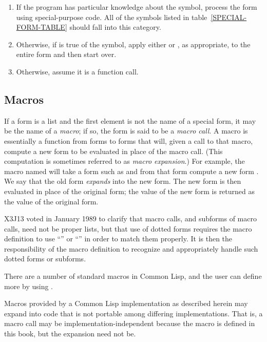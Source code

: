 \begin{enumerate}
\item
If the program has particular knowledge about the symbol,
process the form using special-purpose code.
All of the symbols listed in table~\ref{SPECIAL-FORM-TABLE}
should fall into this category. 

\item
Otherwise, if  is true of the symbol, apply either
 or , as appropriate,
to the entire form and then start over.

\item
Otherwise, assume it is a function call.
\end{enumerate}

\subsection{Macros}

If a form is a list and the first element is not the name of a special
form, it may be the name of a \emph{macro}; if so, the form is said
to be a \emph{macro call}.  A macro is essentially a function from
forms to forms that will, given a call to that macro, compute
a new form to be evaluated in place of the macro call.
(This computation is sometimes referred to as \emph{macro expansion}.)
For example, the macro named  will take a form such as
 and from that form compute a new form
.  We say that the old
form \emph{expands} into the new form.  The new form is then evaluated in
place of the original form; the value of the new form is returned as the
value of the original form.

\begin{new}
X3J13 voted in January 1989
to clarify that macro calls, and subforms
of macro calls, need not be proper lists, but that use of dotted forms
requires the macro definition to use ``'' or
``'' in order to match them properly.
It is then the responsibility of the macro definition to recognize
and appropriately handle such dotted forms or subforms.
\end{new}

There are a number of standard macros in Common Lisp, and the user can define more
by using .

Macros provided by a Common Lisp implementation as described herein may expand
into code that is not portable among differing implementations.
That is, a macro call may be implementation-independent because
the macro is defined in this book, but the expansion need not be.


